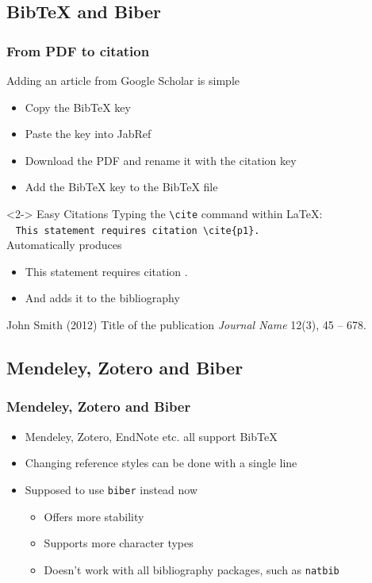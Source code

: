\documentclass[xcolor={svgnames},
hyperref={colorlinks,citecolor=DeepPink4,linkcolor=DarkRed,urlcolor=DarkBlue}
]{beamer}
\begin{document}
	\subsection{BibTeX and Biber}
	\begin{frame}[fragile]
		\frametitle{From PDF to citation}
		Adding an article from Google Scholar is simple
		\begin{itemize}
			\item Copy the BibTeX key
			\item Paste the key into JabRef
			\item Download the PDF and rename it with the citation key
			\item Add the BibTeX key to the BibTeX file
		\end{itemize}
		
		\begin{block}<2-> {Easy Citations}
			Typing the \verb|\cite| command within \LaTeX:\\~
			\verb|This statement requires citation \cite{p1}.| \\
			Automatically produces
			\begin{itemize}
				\item This statement requires citation \cite{p1}.
				\item And adds it to the bibliography
			\end{itemize}
			\footnotesize{
				\begin{thebibliography}{99} %
					 John Smith (2012)
					\newblock Title of the publication
					\newblock \emph{Journal Name} 12(3), 45 -- 678.
				\end{thebibliography}
			}
		\end{block}
	\end{frame}
	
	\subsection{Mendeley, Zotero and Biber}
	\begin{frame}
		\frametitle{Mendeley, Zotero and Biber}
		\begin{itemize}
			\item Mendeley, Zotero, EndNote etc. all support BibTeX
			\item Changing reference styles can be done with a single line
			\item Supposed to use \texttt{biber} instead now
			\begin{itemize}
				\item Offers more stability
				\item Supports more character types
				\item Doesn't work with all bibliography packages, such as \texttt{natbib}
			\end{itemize}
		\end{itemize}
	\end{frame}
	
\end{document}
